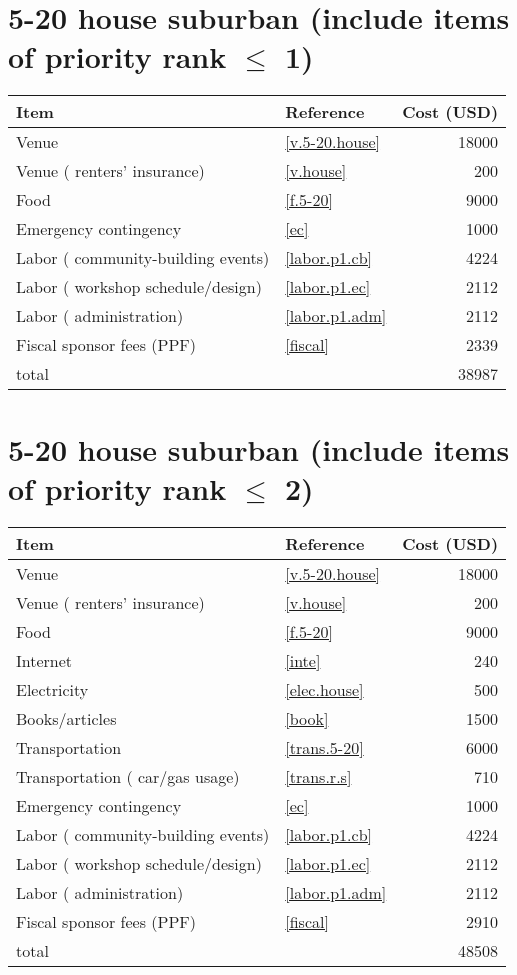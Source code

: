 \section*{5-20 house suburban (include items of priority rank $\leq$ 1)}
\begin{center}
\begin{tabular}{llr}
Item & Reference & Cost (USD) \\ \hline
Venue & \ref{v.5-20.house} & 18000 \\
Venue ( renters' insurance) & \ref{v.house} & 200 \\
Food & \ref{f.5-20} & 9000 \\
Emergency contingency & \ref{ec} & 1000 \\
Labor ( community-building events) & \ref{labor.p1.cb} & 4224 \\
Labor ( workshop schedule/design) & \ref{labor.p1.ec} & 2112 \\
Labor ( administration) & \ref{labor.p1.adm} & 2112 \\
Fiscal sponsor fees (PPF) & \ref{fiscal} & 2339 \\ \hline
total &  & 38987
\end{tabular}
\end{center}
\newpage
\section*{5-20 house suburban (include items of priority rank $\leq$ 2)}
\begin{center}
\begin{tabular}{llr}
Item & Reference & Cost (USD) \\ \hline
Venue & \ref{v.5-20.house} & 18000 \\
Venue ( renters' insurance) & \ref{v.house} & 200 \\
Food & \ref{f.5-20} & 9000 \\
Internet & \ref{inte} & 240 \\
Electricity & \ref{elec.house} & 500 \\
Books/articles & \ref{book} & 1500 \\
Transportation & \ref{trans.5-20} & 6000 \\
Transportation ( car/gas usage) & \ref{trans.r.s} & 710 \\
Emergency contingency & \ref{ec} & 1000 \\
Labor ( community-building events) & \ref{labor.p1.cb} & 4224 \\
Labor ( workshop schedule/design) & \ref{labor.p1.ec} & 2112 \\
Labor ( administration) & \ref{labor.p1.adm} & 2112 \\
Fiscal sponsor fees (PPF) & \ref{fiscal} & 2910 \\ \hline
total &  & 48508
\end{tabular}
\end{center}
\newpage
